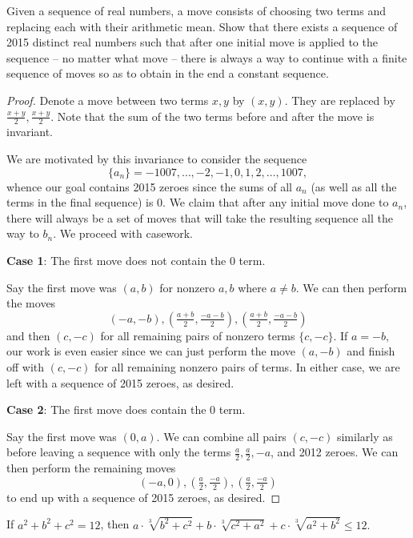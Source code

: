 \documentclass[letterpaper,oneside]{scrartcl}
\begin{document}
\begin{problem*}
  [USAJMO 2015/1]
  Given a sequence of real numbers, a move consists of choosing two terms and replacing each with their arithmetic mean. Show that there exists a sequence of 2015 distinct real numbers such that after one initial move is applied to the sequence -- no matter what move -- there is always a way to continue with a finite sequence of moves so as to obtain in the end a constant sequence.
\end{problem*}
\begin{proof}
  Denote a move between two terms \(x,y\) by \((x,y)\). They are replaced by \(\frac{x+y}{2},\frac{x+y}{2}\). Note that the sum of the two terms before and after the move is invariant.

  We are motivated by this invariance to consider the sequence
  \[\{a_n\} = -1007,\dots,-2,-1,0,1,2,\dots,1007,\]
  whence our goal contains 2015 zeroes
  since the sums of all \(a_n\) (as well as all the terms in the final sequence) is 0.
  We claim that after any initial move done to \(a_n\),
  there will always be a set of moves that will take
  the resulting sequence all the way to \(b_n\).
  We proceed with casework.

  \textbf{Case 1}: The first move does not contain the 0 term.

  Say the first move was \((a,b)\) for nonzero \(a,b\) where \(a \neq b\). We can then perform the moves
  \[(-a,-b), (\tfrac{a+b}{2},\tfrac{-a-b}{2}), (\tfrac{a+b}{2},\tfrac{-a-b}{2})\]
  and then \((c,-c)\) for all remaining pairs of nonzero terms \(\{c,-c\}\).
  If \(a=-b,\) our work is even easier since we can
  just perform the move \((a,-b)\) and finish off with \((c,-c)\) for all remaining nonzero pairs of terms. In either case, we are left with a sequence of 2015 zeroes, as desired.

  \textbf{Case 2}: The first move does contain the 0 term.

  Say the first move was \((0,a)\). We can combine all pairs \((c,-c)\) similarly as before leaving a sequence with only the terms \(\tfrac{a}{2}, \tfrac{a}{2}, -a\), and 2012 zeroes.
  We can then perform the remaining moves
  \[(-a,0),(\tfrac{a}{2},\tfrac{-a}{2}),(\tfrac{a}{2},\tfrac{-a}{2})\]
  to end up with a sequence of 2015 zeroes, as desired.
\end{proof}
\newpage
\begin{problem*}
  If \(a^2+b^2+c^2=12\), then \(a\cdot\sqrt[3]{b^2+c^2}+b\cdot\sqrt[3]{c^2+a^2}+c\cdot\sqrt[3]{a^2+b^2} \leq 12.\)
\end{problem*}
\end{document}
